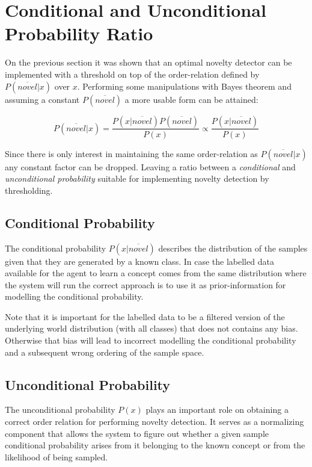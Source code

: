 \section{Conditional and Unconditional Probability Ratio}

On the previous section it was shown that an optimal novelty detector can be
implemented with a threshold on top of the order-relation defined by
$P(\overline{novel}|x)$ over $x$. Performing some manipulations with
Bayes theorem and assuming a constant $P(\overline{novel})$ a more usable
form can be attained:

\begin{equation}
\label{eq:novelty-ratio}
          P(\overline{novel}|x)
  =       \frac{P(x|\overline{novel}) P(\overline{novel})}{P(x)}
  \propto \frac{P(x|\overline{novel})}{P(x)}
\end{equation}

Since there is only interest in maintaining the same order-relation as
$P(\overline{novel}|x)$ any constant factor can be dropped.
Leaving a ratio between a \emph{conditional} and
\emph{unconditional probability} suitable for implementing novelty detection
by thresholding.


\subsection{Conditional Probability}
The conditional probability $P(x|\overline{novel})$ describes the distribution
of the samples given that they are generated by a known class.
In case the labelled data available for the agent to learn a concept comes from
the same distribution where the system will run the correct approach is to use it
as prior-information for modelling the conditional probability.

Note that it is important for the labelled data to be a filtered version
of the underlying world distribution (with all classes) that does not contains
any bias.
Otherwise that bias will lead to incorrect modelling the conditional probability
and a subsequent wrong ordering of the sample space.

\subsection{Unconditional Probability}
The unconditional probability $P(x)$ plays an important role on obtaining a
correct order relation for performing novelty detection.
It serves as a normalizing component that allows the system to figure out
whether a given sample conditional probability arises from it belonging to
the known concept or from the likelihood of being sampled.

